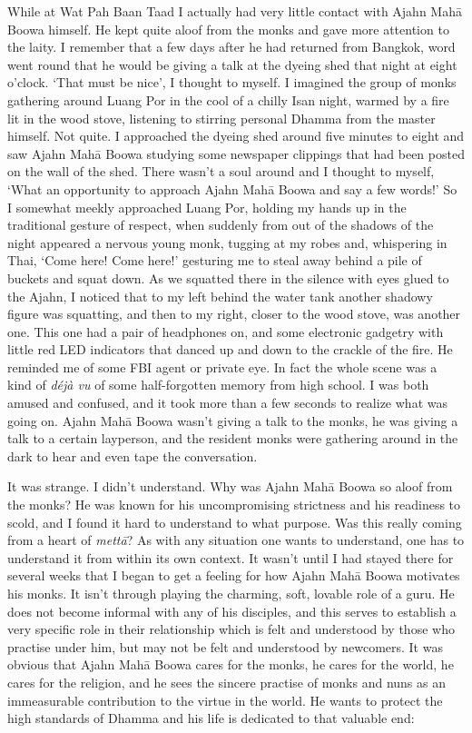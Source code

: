 While at Wat Pah Baan Taad I actually had very little contact with Ajahn
Mahā Boowa himself. He kept quite aloof from the monks and gave more
attention to the laity. I remember that a few days after he had returned
from Bangkok, word went round that he would be giving a talk at the
dyeing shed that night at eight o'clock. `That must be nice', I thought
to myself. I imagined the group of monks gathering around Luang Por
in the cool of a chilly Isan night, warmed by a fire lit in the wood
stove, listening to stirring personal Dhamma from the master himself. 
Not quite. I approached the dyeing shed around five minutes to eight and
saw Ajahn Mahā Boowa studying some newspaper clippings that had been
posted on the wall of the shed. There wasn't a soul around and I thought
to myself, `What an opportunity to approach Ajahn Mahā Boowa and say a
few words!' So I somewhat meekly approached Luang Por, holding my hands
up in the traditional gesture of respect, when suddenly from out of the
shadows of the night appeared a nervous young monk, tugging at my robes
and, whispering in Thai, `Come here! Come here!' gesturing me to steal
away behind a pile of buckets and squat down. As we squatted there in
the silence with eyes glued to the Ajahn, I noticed that to my left
behind the water tank another shadowy figure was squatting, and then to
my right, closer to the wood stove, was another one. This one had a pair
of headphones on, and some electronic gadgetry with little red LED
indicators that danced up and down to the crackle of the fire. He
reminded me of some FBI agent or private eye. In fact the whole scene
was a kind of \emph{déjà vu} of some half-forgotten memory from high
school. I was both amused and confused, and it took more than a few
seconds to realize what was going on. Ajahn Mahā Boowa wasn't giving a
talk to the monks, he was giving a talk to a certain layperson, and the
resident monks were gathering around in the dark to hear and even tape
the conversation. 

It was strange. I didn't understand. Why was Ajahn Mahā Boowa so aloof
from the monks? He was known for his uncompromising strictness and his
readiness to scold, and I found it hard to understand to what purpose. 
Was this really coming from a heart of \emph{mettā}? As with any
situation one wants to understand, one has to understand it from within
its own context. It wasn't until I had stayed there for several weeks
that I began to get a feeling for how Ajahn Mahā Boowa motivates his
monks. It isn't through playing the charming, soft, lovable role of a
guru. He does not become informal with any of his disciples, and this
serves to establish a very specific role in their relationship which is
felt and understood by those who practise under him, but may not be felt
and understood by newcomers. It was obvious that Ajahn Mahā Boowa cares
for the monks, he cares for the world, he cares for the religion, and he
sees the sincere practise of monks and nuns as an immeasurable
contribution to the virtue in the world. He wants to protect the high
standards of Dhamma and his life is dedicated to that valuable end: 

